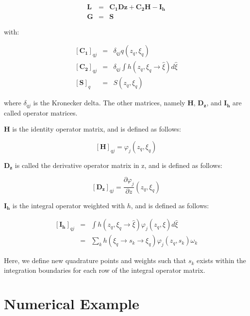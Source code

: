 \documentclass{CFD2011}
\begin{document}
\begin{eqnarray}
\mathbf{L}&=&\mathbf{C_1}\mathbf{Dz}+\mathbf{C_2}\mathbf{H}-\mathbf{I_h} \\
\mathbf{G}&=&\mathbf{S}
\end{eqnarray}

\noindent with:

\begin{eqnarray}
\left[\mathbf{C_1}\right]_{qj}&=& \delta_{qj}q(z_q,\xi_q) \nonumber \\
\left[\mathbf{C_2}\right]_{qj}&=& \delta_{qj}\int h(z_q,\xi_q\rightarrow\hat{\xi})d\hat{\xi} \nonumber \\
\left[\mathbf{S}\right]_{q}&=& S(z_q,\xi_q) \nonumber 
\end{eqnarray}

\noindent where $\delta_{qj}$ is the Kronecker delta. The other matrices, namely $\mathbf{H}$, $\mathbf{D_z}$, and $\mathbf{I_h}$ are called operator matrices.

$\mathbf{H}$ is the identity operator matrix, and is defined as follows:

\begin{equation}
\left[\mathbf{H}\right]_{qj}=\varphi_j(z_q,\xi_q)
\end{equation}

$\mathbf{D_z}$ is called the derivative operator matrix in z, and is defined as follows:

\begin{equation}
\left[\mathbf{D_z}\right]_{qj}=\frac{\partial \varphi_j}{\partial z}(z_q,\xi_q)
\end{equation}

$\mathbf{I_h}$ is the integral operator weighted with $h$, and is defined as follows:

\begin{eqnarray}
\left[\mathbf{I_h}\right]_{qj}&=&\int h(z_q,\xi_q\rightarrow\hat{\xi})\varphi_j(z_q,\hat{\xi}) d\hat{\xi}\nonumber \\
&=&\sum_k h(\xi_q\rightarrow s_k \rightarrow\xi_q)\varphi_j(z_q,s_k) \omega_k
\end{eqnarray}

Here, we define new quadrature points and weights such that $s_k$ exists within the integration boundaries for each row of the integral operator matrix.

\section{Numerical Example}
\end{document}
